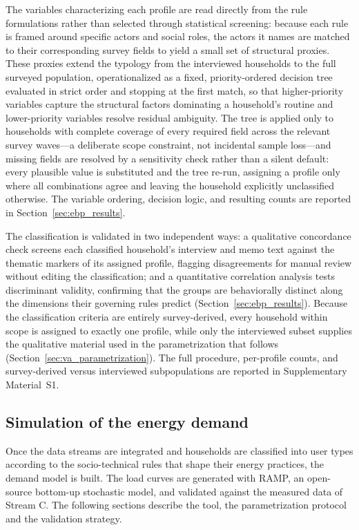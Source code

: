 \documentclass[final,3p,times,onecolumn]{elsarticle}
\begin{document}
The variables characterizing each profile are read directly from the rule formulations rather than selected through statistical screening: because each rule is framed around specific actors and social roles, the actors it names are matched to their corresponding survey fields to yield a small set of structural proxies. These proxies extend the typology from the interviewed households to the full surveyed population, operationalized as a fixed, priority-ordered decision tree evaluated in strict order and stopping at the first match, so that higher-priority variables capture the structural factors dominating a household's routine and lower-priority variables resolve residual ambiguity. The tree is applied only to households with complete coverage of every required field across the relevant survey waves---a deliberate scope constraint, not incidental sample loss---and missing fields are resolved by a sensitivity check rather than a silent default: every plausible value is substituted and the tree re-run, assigning a profile only where all combinations agree and leaving the household explicitly unclassified otherwise. The variable ordering, decision logic, and resulting counts are reported in Section~\ref{sec:ebp_results}.

The classification is validated in two independent ways: a qualitative concordance check screens each classified household's interview and memo text against the thematic markers of its assigned profile, flagging disagreements for manual review without editing the classification; and a quantitative correlation analysis tests discriminant validity, confirming that the groups are behaviorally distinct along the dimensions their governing rules predict (Section~\ref{sec:ebp_results}). Because the classification criteria are entirely survey-derived, every household within scope is assigned to exactly one profile, while only the interviewed subset supplies the qualitative material used in the parametrization that follows (Section~\ref{sec:va_parametrization}). The full procedure, per-profile counts, and survey-derived versus interviewed subpopulations are reported in Supplementary Material~S1.

\subsection{Simulation of the energy demand}
\label{sec:ramp}

Once the data streams are integrated and households are classified into user types according to the socio-technical rules that shape their energy practices, the demand model is built. The load curves are generated with RAMP, an open-source bottom-up stochastic model, and validated against the measured data of Stream C. The following sections describe the tool, the parametrization protocol and the validation strategy.
\end{document}
